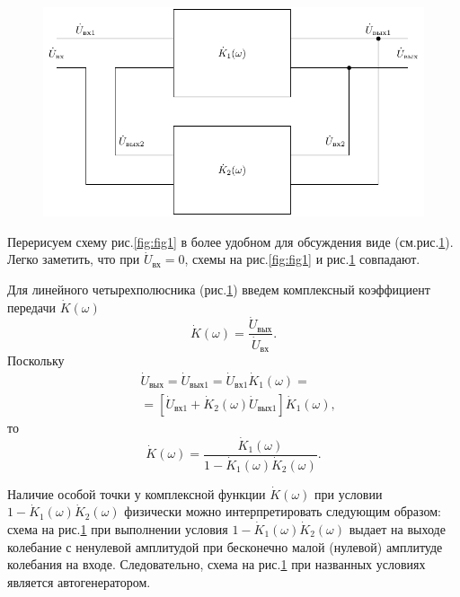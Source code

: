 \begin{figure}[h]
	\centering
	\includegraphics[width=\linewidth]{circuit/two.pdf}
	\caption{}
	\label{fig:fig3}
\end{figure}

Перерисуем схему рис.\ref{fig:fig1} в более удобном для обсуждения виде (см.рис.\ref{fig:fig3}). Легко заметить, что при $\dot{U}_\text{вх}=0$, схемы на рис.\ref{fig:fig1} и рис.\ref{fig:fig3} совпадают.

Для линейного четырехполюсника (рис.\ref{fig:fig3}) введем комплексный коэффициент передачи $\dot{K}(\omega)$
\begin{equation*}
\dot{K}(\omega)=\frac{\dot{U}_\text{вых}}{\dot{U}_\text{вх}}.
\end{equation*}
Поскольку
\begin{equation*}
\begin{aligned}
&\dot{U}_\text{вых}=\dot{U}_{\text{вых}1}=\dot{U}_{\text{вх}1}\dot{K}_1(\omega)=\\
&= [\dot{U}_{\text{вх}1}+\dot{K}_2(\omega)\dot{U}_{\text{вых}1}]\dot{K}_1(\omega),
\end{aligned}
\end{equation*}
то 
\begin{equation*}
\dot{K}(\omega)=\frac{\dot{K}_1(\omega)}{1-\dot{K}_1(\omega)\dot{K}_2(\omega)}.
\end{equation*}

Наличие особой точки у комплексной функции $\dot{K}(\omega)$ при условии $1-\dot{K}_1(\omega)\dot{K}_2(\omega)$ физически можно интерпретировать следующим образом: схема на рис.\ref{fig:fig3} при выполнении условия $1-\dot{K}_1(\omega)\dot{K}_2(\omega)$ выдает на выходе колебание с ненулевой амплитудой при бесконечно малой (нулевой) амплитуде колебания на входе. Следовательно, схема  на рис.\ref{fig:fig3} при названных условиях является автогенератором.

